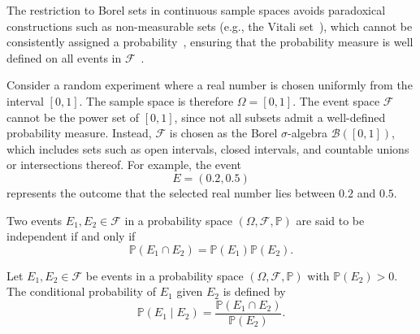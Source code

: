\begin{remark}
	The restriction to Borel sets in continuous sample spaces avoids paradoxical constructions such as non-measurable sets (e.g., the Vitali set~\cite{vitali1905sui}), which cannot be consistently assigned a probability~\cite{fremlin2000measure}, ensuring that the probability measure is well defined on all events in $\mathcal{F}$~\cite{billingsley1995probability}.
\end{remark}

\begin{example}
	\label{ex:borel_continuous_events}
	Consider a random experiment where a real number is chosen uniformly from the interval $[0,1]$. The sample space is therefore $\Omega = [0,1]$. The event space $\mathcal{F}$ cannot be the power set of $[0,1]$, since not all subsets admit a well-defined probability measure. Instead, $\mathcal{F}$ is chosen as the Borel $\sigma$-algebra $\mathcal{B}([0,1])$, which includes sets such as open intervals, closed intervals, and countable unions or intersections thereof. 
	For example, the event 
	\begin{equation}
		E = (0.2, 0.5)
	\end{equation}
	represents the outcome that the selected real number lies between $0.2$ and $0.5$.
\end{example}

\begin{definition}[Independence]
	\label{def:independence}
	Two events $E_1, E_2 \in \mathcal{F}$ in a probability space $(\Omega, \mathcal{F}, \mathbb{P})$ are said to be independent if and only if
	\begin{equation}
		\mathbb{P}(E_1 \cap E_2) = \mathbb{P}(E_1) \mathbb{P}(E_2).
	\end{equation}
\end{definition}

\begin{definition}
	\label{def:conditional_probability}
	Let $E_1, E_2 \in \mathcal{F}$ be events in a probability space $(\Omega, \mathcal{F}, \mathbb{P})$ with $\mathbb{P}(E_2) > 0$. 
	The conditional probability of $E_1$ given $E_2$ is defined by
	\begin{equation}
		\mathbb{P}(E_1 \mid E_2) = \frac{\mathbb{P}(E_1 \cap E_2)}{\mathbb{P}(E_2)}.
	\end{equation}
\end{definition}

